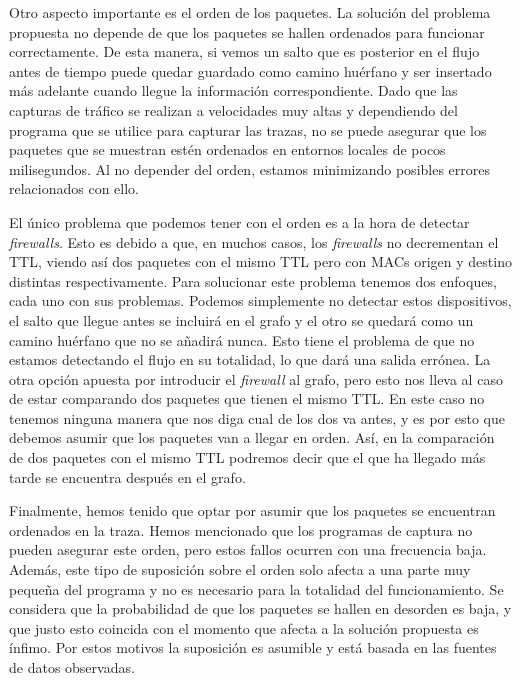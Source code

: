 \documentclass[twoside, 12pt]{epstfg}
\begin{document}
Otro aspecto importante es el orden de los paquetes. La solución del problema propuesta no depende de que los paquetes se hallen ordenados para funcionar correctamente. De esta manera, si vemos un salto que es posterior en el flujo antes de tiempo puede quedar guardado como camino huérfano y ser insertado más adelante cuando llegue la información correspondiente. Dado que las capturas de tráfico se realizan a velocidades muy altas y dependiendo del programa que se utilice para capturar las trazas, no se puede asegurar que los paquetes que se muestran estén ordenados en entornos locales de pocos milisegundos. Al no depender del orden, estamos minimizando posibles errores relacionados con ello.

El único problema que podemos tener con el orden es a la hora de detectar \textit{firewalls}. Esto es debido a que, en muchos casos, los \textit{firewalls} no decrementan el TTL, viendo así dos paquetes con el mismo TTL pero con MACs origen y destino distintas respectivamente. Para solucionar este problema tenemos dos enfoques, cada uno con sus problemas. Podemos simplemente no detectar estos dispositivos, el salto que llegue antes se incluirá en el grafo y el otro se quedará como un camino huérfano que no se añadirá nunca. Esto tiene el problema de que no estamos detectando el flujo en su totalidad, lo que dará una salida errónea. La otra opción apuesta por introducir el \textit{firewall} al grafo, pero esto nos lleva al caso de estar comparando dos paquetes que tienen el mismo TTL. En este caso no tenemos ninguna manera que nos diga cual de los dos va antes, y es por esto que debemos asumir que los paquetes van a llegar en orden. Así, en la comparación de dos paquetes con el mismo TTL podremos decir que el que ha llegado más tarde se encuentra después en el grafo.

Finalmente, hemos tenido que optar por asumir que los paquetes se encuentran ordenados en la traza. Hemos mencionado que los programas de captura no pueden asegurar este orden, pero estos fallos ocurren con una frecuencia baja. Además, este tipo de suposición sobre el orden solo afecta a una parte muy pequeña del programa y no es necesario para la totalidad del funcionamiento. Se considera que la probabilidad de que los paquetes se hallen en desorden es baja, y que justo esto coincida con el momento que afecta a la solución propuesta es ínfimo. Por estos motivos la suposición es asumible y está basada en las fuentes de datos observadas.
\end{document}
